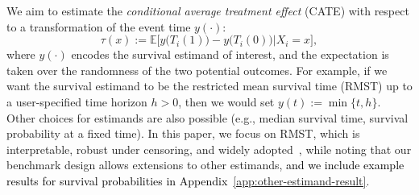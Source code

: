 \documentclass{article} %
\newcommand{\rebuttal}[1]{\textcolor{black}{#1}}
\begin{document}
We aim to estimate the \emph{conditional average treatment effect} (CATE) with respect to a transformation of the event time $y(\cdot)$:
\begin{equation} \label{eq:cate}
    \tau(x) := \mathbb{E}\big[ y\big(T_i(1)\big) - y\big(T_i(0)\big) | X_i=x\big],
\end{equation}
where $y(\cdot)$ encodes the survival estimand of interest, and the expectation is taken over the randomness of the two potential outcomes. For example, if we want the survival estimand to be the restricted mean survival time (RMST) up to a user-specified time horizon $h>0$, then we would set $y(t):=\min\{t,h\}$. Other choices for estimands are also possible (e.g., %
median survival time, survival probability at a fixed time). In this paper, we focus on RMST, which is interpretable, robust under censoring, and widely adopted~\citep{shen2018estimating, curth2021survite, cui2023estimating}, while noting that our benchmark design allows extensions to other estimands, \rebuttal{and we include example results for survival probabilities in Appendix~\ref{app:other-estimand-result}}.
\end{document}
